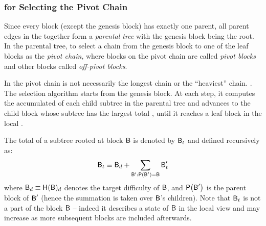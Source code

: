 \subsubsection{ for Selecting the Pivot Chain }
\label{subsec:GHAST parent}

Since every block (except the genesis block) has exactly one parent, all parent edges in the \tg together form a \emph{parental tree} with the genesis block being the root. 
In the parental tree, {\name}  to select a chain from the genesis block to one of the leaf blocks as the \emph{pivot
chain},
where blocks on the pivot chain are called \emph{pivot blocks} and other blocks called \emph{off-pivot blocks}.

In {\name} the pivot chain is not necessarily the longest chain or the ``heaviest'' chain.
. 
% 
The {\name} selection algorithm starts from the genesis block. 
At each step, it computes the accumulated 
 of each child subtree in the parental tree and advances to the child
block whose subtree has the largest total , until it reaches a leaf block in the local \tg. 

The total  of a subtree rooted at block $\textsf{B}$ is denoted by $\textsf{B}_t$ and defined recursively as:
\begin{align}
	\textsf{B}_t \equiv \textsf{B}_d + \sum_{\textsf{B}': \mathsf{P}{\left({\textsf{B}'} \right)}=\textsf{B}} \textsf{B}'_t 
\end{align}
where $\textsf{B}_d\equiv \textsf{H}(\textsf{B})_d$ denotes the target difficulty of $\textsf{B}$, 
and $\mathsf{P}{\left({\textsf{B}'} \right)}$ is the parent block of $\textsf{B}'$ (hence the summation is taken over $\textsf{B}$'s children).
Note that $\textsf{B}_t$ is not a part of the block $\textsf{B}$ -- indeed it describes a state of $\textsf{B}$ in the local view and may increase as more subsequent blocks are included afterwards.


